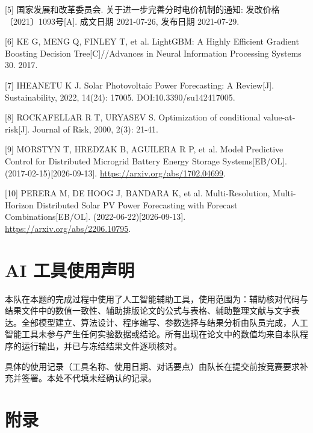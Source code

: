 \documentclass[12pt,a4paper]{ctexart}
\begin{document}
{\footnotesize\noindent\hangindent=0.65cm [5] 国家发展和改革委员会. 关于进一步完善分时电价机制的通知: 发改价格〔2021〕1093号[A]. 成文日期 2021-07-26, 发布日期 2021-07-29.\par}

{\footnotesize\noindent\hangindent=0.65cm [6] KE G, MENG Q, FINLEY T, et al. LightGBM: A Highly Efficient Gradient Boosting Decision Tree[C]//Advances in Neural Information Processing Systems 30. 2017.\par}

{\footnotesize\noindent\hangindent=0.65cm [7] IHEANETU K J. Solar Photovoltaic Power Forecasting: A Review[J]. Sustainability, 2022, 14(24): 17005. DOI:10.3390/su142417005.\par}

{\footnotesize\noindent\hangindent=0.65cm [8] ROCKAFELLAR R T, URYASEV S. Optimization of conditional value-at-risk[J]. Journal of Risk, 2000, 2(3): 21-41.\par}

{\footnotesize\noindent\hangindent=0.65cm [9] MORSTYN T, HREDZAK B, AGUILERA R P, et al. Model Predictive Control for Distributed Microgrid Battery Energy Storage Systems[EB/OL]. (2017-02-15)[2026-09-13]. \url{https://arxiv.org/abs/1702.04699}.\par}

{\footnotesize\noindent\hangindent=0.65cm [10] PERERA M, DE HOOG J, BANDARA K, et al. Multi-Resolution, Multi-Horizon Distributed Solar PV Power Forecasting with Forecast Combinations[EB/OL]. (2022-06-22)[2026-09-13]. \url{https://arxiv.org/abs/2206.10795}.\par}

\section*{AI 工具使用声明}

本队在本题的完成过程中使用了人工智能辅助工具，使用范围为：辅助核对代码与结果文件中的数值一致性、辅助排版论文的公式与表格、辅助整理文献与文字表达。全部模型建立、算法设计、程序编写、参数选择与结果分析由队员完成，人工智能工具未参与产生任何实验数据或结论。所有出现在论文中的数值均来自本队程序的运行输出，并已与冻结结果文件逐项核对。

具体的使用记录（工具名称、使用日期、对话要点）由队长在提交前按竞赛要求补充并签署。本处不代填未经确认的记录。

\section*{附录}
\end{document}
